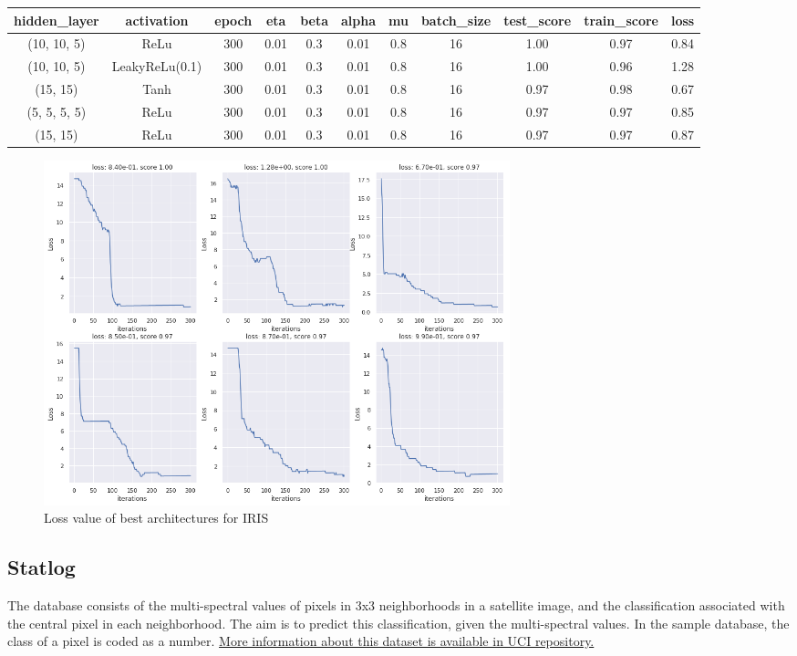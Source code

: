 \documentclass[10pt]{SelfArx} %
\begin{document}
\begin{table}[hbt]
	\centering
  \begin{tabular*}{1\textwidth}{@{\extracolsep{\fill} }ccccccccccc@{}}
	\toprule
	hidden\_layer & activation & epoch & eta & beta & alpha & mu & batch\_size & test\_score & train\_score & loss \\ \midrule
	(10, 10, 5) & ReLu & 300 & 0.01 & 0.3 & 0.01 & 0.8 & 16 & 1.00 & 0.97 & 0.84 \\
	(10, 10, 5) & LeakyReLu(0.1) & 300 & 0.01 & 0.3 & 0.01 & 0.8 & 16 & 1.00 & 0.96 & 1.28 \\
	(15, 15) & Tanh & 300 & 0.01 & 0.3 & 0.01 & 0.8 & 16 & 0.97 & 0.98 & 0.67 \\
	(5, 5, 5, 5) & ReLu & 300 & 0.01 & 0.3 & 0.01 & 0.8 & 16 & 0.97 & 0.97 & 0.85 \\
	(15, 15) & ReLu & 300 & 0.01 & 0.3 & 0.01 & 0.8 & 16 & 0.97 & 0.97 & 0.87 \\ \bottomrule
\end{tabular*}
	\label{tiris}
\end{table}
\begin{figure}\centering
	\includegraphics[width=1.79\columnwidth, height=10cm]{img/iris-plots1}
	\caption{Loss value of best architectures for IRIS}
	\label{firis}
\end{figure}

\subsection{Statlog}
The database consists of the multi-spectral values of pixels in 3x3 neighborhoods in a satellite image, and the classification associated with the central pixel in each neighborhood. The aim is to predict this classification, given the multi-spectral values. In the sample database, the class of a pixel is coded as a number. \href{https://archive.ics.uci.edu/ml/datasets/Statlog+(Landsat+Satellite)}{More information about this dataset is available in UCI repository.}
\end{document}
